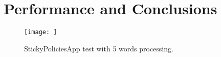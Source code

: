 \chapter{Performance and Conclusions}
\label{chapter4}
\thispagestyle{empty}

\noindent 
\begin{figure}
	\centering
	\texttt{[image: ]}
	\caption{StickyPoliciesApp test with 5 words processing.}
	\label{fig:performance-5words}
\end{figure}

